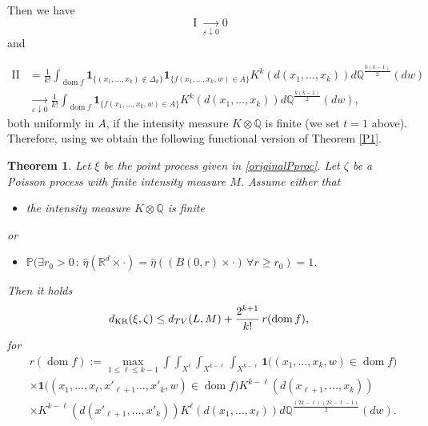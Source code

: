 \documentclass{article}
\newtheorem{theorem}{Theorem}[section]
\theoremstyle{definition}
\numberwithin{equation}{section}
\theoremstyle{remark}
\begin{document}
Then we have
$$ \operatorname{I}  \mathrel{\mathop{\to}\limits_{\varepsilon \downarrow 0}} 0
$$
and

\begin{align*}
     \operatorname{II}  & = \frac{1}{k!}  \int_{\operatorname{dom} f} \mathbf{1}_{\{  ( {x}_1, \ldots, {x}_k ) \notin \Delta_{k} \} }  \mathbf{1}_{\{  {f}({x}_1, \ldots, {x}_k, w) \in A\}} {K}^k(d({x}_1, \ldots, {x}_k))d\mathbb{Q}^{\frac{k (k-1)}{2}} (dw) \\
     &  \mathrel{\mathop{\to}\limits_{\varepsilon \downarrow 0}}\frac{1}{k!}  \int_{\operatorname{dom} f}   \mathbf{1}_{\{  {f}({x}_1, \ldots, {x}_k, w) \in A\}} {K}^k(d({x}_1, \ldots, {x}_k))d\mathbb{Q}^{\frac{k (k-1)}{2}} (dw) ,
\end{align*}
both uniformly in $A$, if the intensity measure $K \otimes \mathbb{Q}$ is finite (we set $t=1$ above). Therefore, using \cite[Theorem 3.1]{dst} we obtain the following functional version of Theorem \ref{P1}.

\begin{theorem} \label{PPA}
    Let $\xi$ be the point process given in \eqref{originalPproc}. Let $\zeta$ be a Poisson process with finite intensity measure $M$. Assume either that
    \begin{itemize}
        \item[(i)] the intensity measure $K \otimes \mathbb{Q}$ is finite
    \end{itemize}
    or
    \begin{itemize}
        \item[(ii)] $\mathbb{P} (\exists r_0>0 \,: \, \hat{\eta}( \mathbb{R}^d \times \cdot) = \hat{\eta}( (B(0,r) \times \cdot) \, \forall r \geq r_0 ) = 1$.
    \end{itemize}
    Then it holds
    \begin{align*}
        d_{\rm KR}({\xi}, \zeta) \leq d_{TV}(L,M) + \frac{2^{k+1}}{k!} \, r(\operatorname{dom} f),
    \end{align*}
for
\begin{align*}
  &  r(\operatorname{dom} f) := \max_{1 \leq \ell \leq k-1} 
\int \int_{X^\ell}  
\int_{X^{k - \ell}}\int_{X^{k - \ell}} \mathbf{1}\big(  ( {x}_1, \ldots, {x}_k , w ) \in \operatorname{dom} f  \big)  \\
&  \times \mathbf{1}\big( ( {x}_1, \ldots, {x}_\ell, {x}'_{\ell+1} \ldots, {x}'_{k}, w ) \in \operatorname{dom} f \big){K}^{k - \ell}(d({x}_{\ell+1}, \ldots, {x}_k)) \\
&  \times  {K}^{k - \ell}(d({x}'_{\ell+1}, \ldots, {x}'_k)) {K}^\ell(d({x}_1, \ldots, {x}_\ell)) d\mathbb{Q}^{\frac{(2k - \ell) (2k -\ell-1)}{2}} (dw) .
\end{align*}
  
\end{theorem}
\end{document}
